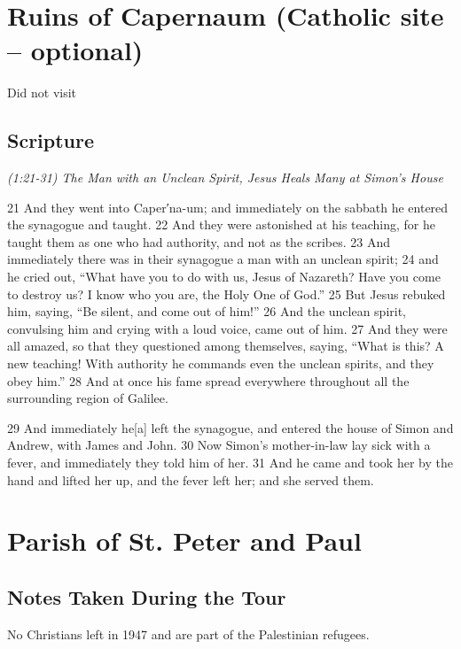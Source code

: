 \documentclass[letterpaper]{report}
\begin{document}
\clearpage
\section{Ruins of Capernaum (Catholic site – optional)}
\begin{multicols}{2}
	Did not visit
\end{multicols}
\subsection{Scripture}

{\centering
	\emph{(1:21-31) The Man with an Unclean Spirit,
		Jesus Heals Many at Simon’s House}\\
}
\begin{multicols}{2}
21 And they went into Caper′na-um; and immediately on the sabbath he entered the synagogue and taught. 22 And they were astonished at his teaching, for he taught them as one who had authority, and not as the scribes. 23 And immediately there was in their synagogue a man with an unclean spirit; 24 and he cried out, “What have you to do with us, Jesus of Nazareth? Have you come to destroy us? I know who you are, the Holy One of God.” 25 But Jesus rebuked him, saying, “Be silent, and come out of him!” 26 And the unclean spirit, convulsing him and crying with a loud voice, came out of him. 27 And they were all amazed, so that they questioned among themselves, saying, “What is this? A new teaching! With authority he commands even the unclean spirits, and they obey him.” 28 And at once his fame spread everywhere throughout all the surrounding region of Galilee.

29 And immediately he[a] left the synagogue, and entered the house of Simon and Andrew, with James and John. 30 Now Simon’s mother-in-law lay sick with a fever, and immediately they told him of her. 31 And he came and took her by the hand and lifted her up, and the fever left her; and she served them.
\end{multicols}

\clearpage
\section{Parish of St. Peter and Paul}
\begin{multicols}{2}
	\mbox{}
\end{multicols}
\subsection{Notes Taken During the Tour}
No Christians left in 1947 and are part of the Palestinian refugees.
\end{document}
